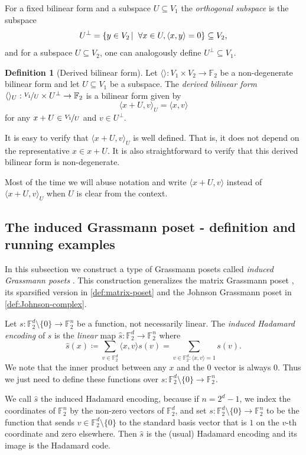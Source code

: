 \documentclass[10pt,a4paper]{article}
\newcommand{\prettyref}[1]{\cref{#1}}
\theoremstyle{definition}
\newtheorem{definition}[theorem]{Definition}
\theoremstyle{remark}
\newcommand{\Authornotecolored}[3]{{\sffamily\small\color{#1}{[#2: #3]}}}
\newcommand{\Authornotecolored}[3]{}
\newcommand{\Ynote}{\Authornotecolored{Purple}{Y}}
\newcommand{\Snote}{\Authornotecolored{Green}{S}}
\newcommand{\snote}{\Snote}
\newcommand\sett[2]{\left\{ #1 \left| \; \vphantom{#1 #2} \right. #2  \right\}}
\newcommand{\set}[1]{\{#1\}}
\newcommand{\iprod}[1]{\langle#1\rangle}
\newcommand{\F}{\mathbb{F}}
\numberwithin{equation}{section}
\let\pref=\prettyref
\begin{document}
For a fixed bilinear form and a subspace \(U \subseteq V_1\) the \emph{orthogonal subspace} is the subspace \[U^\bot = \sett{y \in V_2}{\forall x \in U, \iprod{x,y}=0} \subseteq V_2,\]
and for a subspace \(U \subseteq V_2\), one can analogously define \(U^\bot \subseteq V_1\). 
\begin{definition}[Derived bilinear form]
    Let \(\iprod{}:V_1 \times V_2 \to \F_2\) be a non-degenerate bilinear form and let \(U \subseteq V_1\) be a subspace. The \emph{derived bilinear form} \(\iprod{}_U:\nicefrac{V_1}{U} \times U^\bot \to \F_2\) is a bilinear form given by
\[\iprod{x+U,v}_U = \iprod{x,v}\]
for any \(x+U \in \nicefrac{V_1}{U}\) and \(v \in U^\bot\).
\end{definition}
It is easy to verify that \(\iprod{x+U,v}_U\) is well defined. That is, it does not depend on the representative \(x \in x+U\). It is also straightforward to verify that this derived bilinear form is non-degenerate.

Most of the time we will abuse notation and write \(\iprod{x+U,v}\) instead of \(\iprod{x+U,v}_U\) when $U$ is clear from the context.

\subsection{The induced Grassmann poset - definition and running examples}
In this subsection we construct a type of Grassmann posets called \emph{induced Grassmann posets} \Ynote{Hadamard Grassmann posets?}. This construction generalizes the matrix Grassmann poset \cite{Golowich2023}, its sparsified version in \pref{def:matrix-poset} and the Johnson Grassmann poset in \pref{def:Johnson-complex}.

Let \(s:\F_2^d \setminus \set{0} \to \F_2^n\) be a function, not necessarily linear. The \emph{induced Hadamard encoding} of \(s\) is the \emph{linear} map \(\widehat{s}:\F_2^d \to \F_2^n\) where 
\[\widehat{s}(x) \coloneqq \sum_{v \in \F_2^d}\iprod{x,v} s(v) = \sum_{v \in \F_2^d: \iprod{x,v}=1} s(v).\]
We note that the inner product between any $x$ and the \(0\) vector is always \(0\). Thus we just need to define these functions over \(s:\F_2^d \setminus \set{0} \to \F_2^n\).

We call \(\widehat{s}\) the induced Hadamard encoding, because if \(n=2^d - 1\), we index the coordinates of \(\F_2^{n}\) by the non-zero vectors of \(\F_2^d\), and set \(s:\F_2^d \setminus \set{0} \to \F_2^{n}\) to be the function that sends $v\in\F_2^d\setminus\set{0}$ to the standard basis vector that is \(1\) on the \(v\)-th coordinate and zero elsewhere. Then \(\widehat{s}\) is the (usual) Hadamard encoding and its image is the Hadamard code. %
\end{document}
